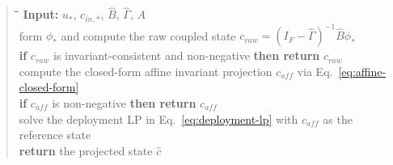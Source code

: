 \documentclass[a4paper,fleqn]{cas-sc}
\newenvironment{revblock}{}{}
\newenvironment{revblockr127}{}{}
\begin{document}
\begin{revblock}
\begin{revblockr127}
\begin{minipage}{\textwidth}
\begin{quote}
\begin{tabbing}
\hspace{0.6cm}\=\hspace{0.6cm}\=\hspace{0.6cm}\=\kill
\textbf{Input:} $u_*$, $c_{in,*}$, $\widehat{B}$, $\widehat{\Gamma}$, $A$ \\
form $\phi_*$ and compute the raw coupled state $c_{raw} = (I_F - \widehat{\Gamma})^{-1}\widehat{B}\phi_*$ \\
\textbf{if} $c_{raw}$ is invariant-consistent and non-negative \textbf{then return} $c_{raw}$ \\
compute the closed-form affine invariant projection $c_{aff}$ via Eq.~\eqref{eq:affine-closed-form} \\
\textbf{if} $c_{aff}$ is non-negative \textbf{then return} $c_{aff}$ \\
solve the deployment LP in Eq.~\eqref{eq:deployment-lp} with $c_{aff}$ as the reference state \\
\textbf{return} the projected state $\hat{c}$
\end{tabbing}
\end{quote}
\end{minipage}

\end{revblockr127}

\end{revblock}
\end{document}
